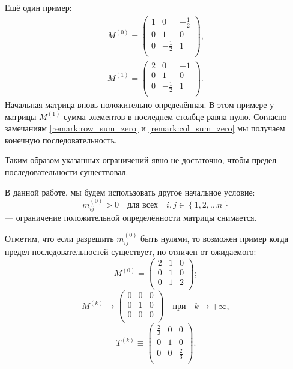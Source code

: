 \documentclass{article}
\newcommand{\mk}[1][k]{m^{(#1)}}
\newcommand{\Mk}[1][k]{M^{(#1)}}
\newcommand{\Tk}[1][k]{T^{(#1)}}
\begin{document}
Ещё один пример:
\begin{gather*}
  \Mk[0] = \left(
  \begin{array}{ccc}
     1 &            0 & -\frac{1}{2} \\
     0 &            1 &            0 \\
     0 & -\frac{1}{2} &            1 \\
  \end{array}
  \right), \\
  \Mk[1] = \left(
  \begin{array}{ccc}
     2 &            0 & -1 \\
     0 &            1 &  0 \\
     0 & -\frac{1}{2} &  1 \\
  \end{array}
  \right).
\end{gather*}
Начальная матрица вновь положительно определённая. В этом примере у матрицы $\Mk[1]$ сумма элементов в последнем столбце равна нулю. Согласно замечаниям \ref{remark:row_sum_zero} и \ref{remark:col_sum_zero} мы получаем конечную последовательность.

Таким образом указанных ограничений явно не достаточно, чтобы предел последовательности существовал.


В данной работе, мы будем использовать другое начальное условие: 
\begin{equation}
  \label{eq:constraint}
  \mk[0]_{ij} > 0 \quad \text{для всех} \quad i,j \in \left\{ 1, 2, \ldots n \right\}
\end{equation}
— ограничение положительной определённости матрицы снимается.


Отметим, что если разрешить $\mk[0]_{ij}$ быть нулями, то возможен пример когда предел последовательностей существует, но отличен от ожидаемого:
\begin{displaymath}
  \Mk[0] = \left(
  \begin{array}{ccc}
      2 & 1 & 0 \\
      0 & 1 & 0 \\
      0 & 1 & 2 \\
  \end{array}
  \right);
\end{displaymath}
\begin{displaymath}
  \Mk \rightarrow \left(
  \begin{array}{ccc}
      0 & 0 & 0 \\
      0 & 1 & 0 \\
      0 & 0 & 0 \\
  \end{array}
  \right)
  \quad \text{при} \quad k \rightarrow +\infty,
\end{displaymath}
\begin{displaymath}
  \Tk \equiv \left(
  \begin{array}{ccc}
      \frac{2}{3} & 0 &           0 \\
                0 & 1 &           0 \\
                0 & 0 & \frac{2}{3} \\
  \end{array}
  \right).
\end{displaymath}
\end{document}
